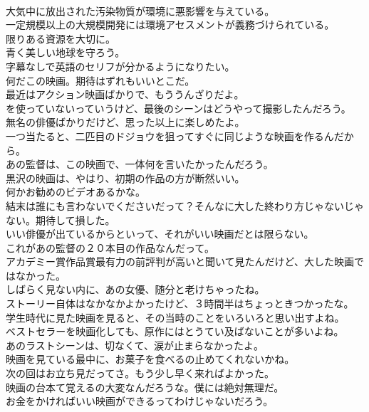 \documentclass[8pt]{extreport}
\begin{document}
\begin{CJK}{UTF8}{min}
\\	大気中に放出された汚染物質が環境に悪影響を与えている。	
\\	一定規模以上の大規模開発には環境アセスメントが義務づけられている。	
\\	限りある資源を大切に。	
\\	青く美しい地球を守ろう。	
\\	字幕なしで英語のセリフが分かるようになりたい。	
\\	何だこの映画。期待はずれもいいとこだ。	
\\	最近はアクション映画ばかりで、もううんざりだよ。	
\\	を使っていないっていうけど、最後のシーンはどうやって撮影したんだろう。	
\\	無名の俳優ばかりだけど、思った以上に楽しめたよ。	
\\	一つ当たると、二匹目のドジョウを狙ってすぐに同じような映画を作るんだから。	
\\	あの監督は、この映画で、一体何を言いたかったんだろう。	
\\	黒沢の映画は、やはり、初期の作品の方が断然いい。	
\\	何かお勧めのビデオあるかな。	
\\	結末は誰にも言わないでくださいだって？そんなに大した終わり方じゃないじゃない。期待して損した。	
\\	いい俳優が出ているからといって、それがいい映画だとは限らない。	
\\	これがあの監督の２０本目の作品なんだって。	
\\	アカデミー賞作品賞最有力の前評判が高いと聞いて見たんだけど、大した映画ではなかった。	
\\	しばらく見ない内に、あの女優、随分と老けちゃったね。	
\\	ストーリー自体はなかなかよかったけど、３時間半はちょっときつかったな。	
\\	学生時代に見た映画を見ると、その当時のことをいろいろと思い出すよね。	
\\	ベストセラーを映画化しても、原作にはとうてい及ばないことが多いよね。	
\\	あのラストシーンは、切なくて、涙が止まらなかったよ。	
\\	映画を見ている最中に、お菓子を食べるの止めてくれないかね。	
\\	次の回はお立ち見だってさ。もう少し早く来ればよかった。	
\\	映画の台本て覚えるの大変なんだろうな。僕には絶対無理だ。	
\\	お金をかければいい映画ができるってわけじゃないだろう。	

\end{CJK}
\end{document}
